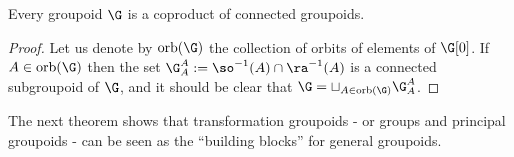 \begin{proposition}\label{propositioneverygroupoidisacoproductofconnected}
Every groupoid $\G$ is a coproduct of connected groupoids.
\end{proposition}
\begin{proof}
Let us denote by $\operatorname{orb}(\G)$ the collection of orbits of elements of $\G[0]$. If $A\in\operatorname{orb}(\G)$ then the set $\G_A^A:=\so^{-1}(A)\cap\ra^{-1}(A)$ is a connected subgroupoid of $\G$, and it should be clear that $\G=\sqcup_{A\in\operatorname{orb}(\G)}\G_A^A$.\qedhere
\end{proof}

The next theorem shows that transformation groupoids - or groups and principal groupoids - can be seen as the ``building blocks'' for general groupoids.

